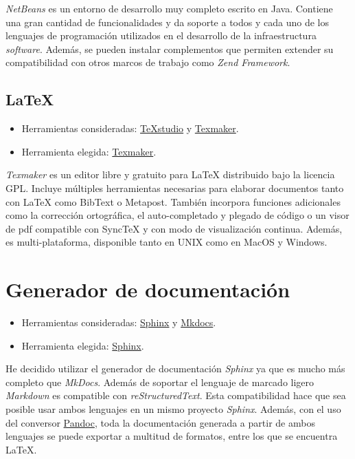 \emph{NetBeans} es un entorno de desarrollo muy completo escrito en Java.
Contiene una gran cantidad de funcionalidades y da soporte a todos y
cada uno de los lenguajes de programación utilizados en el desarrollo de
la infraestructura \emph{software}. Además, se pueden instalar
complementos que permiten extender su compatibilidad con otros marcos de
trabajo como \emph{Zend Framework}.

\subsection{LaTeX}

\begin{itemize}
\tightlist
\item
  Herramientas consideradas:
  \href{https://www.texstudio.org/}{TeXstudio} y
  \href{http://www.xm1math.net/texmaker/}{Texmaker}.
\item
  Herramienta elegida:
  \href{http://www.xm1math.net/texmaker/}{Texmaker}.
\end{itemize}

\emph{Texmaker} es un editor libre y gratuito para LaTeX distribuido
bajo la licencia GPL. Incluye múltiples herramientas necesarias para
elaborar documentos tanto con LaTeX como BibText o Metapost. También
incorpora funciones adicionales como la corrección ortográfica, el
auto-completado y plegado de código o un visor de pdf compatible con
SyncTeX y con modo de visualización continua. Además, es
multi-plataforma, disponible tanto en UNIX como en MacOS y Windows.

\section{Generador de documentación}

\begin{itemize}
\tightlist
\item
  Herramientas consideradas:
  \href{https://www.sphinx-doc.org/es/master/index.html}{Sphinx} y
  \href{https://www.mkdocs.org/}{Mkdocs}.
\item
  Herramienta elegida:
  \href{https://www.sphinx-doc.org/es/master/index.html}{Sphinx}.
\end{itemize}

He decidido utilizar el generador de documentación \emph{Sphinx} ya que
es mucho más completo que \emph{MkDocs}. Además de soportar el lenguaje
de marcado ligero \emph{Markdown} es compatible con
\emph{reStructuredText}. Esta compatibilidad hace que sea posible usar
ambos lenguajes en un mismo proyecto \emph{Sphinx}. Además, con el uso
del conversor \href{http://pandoc.org/}{Pandoc}, toda la documentación
generada a partir de ambos lenguajes se puede exportar a multitud de
formatos, entre los que se encuentra LaTeX.

